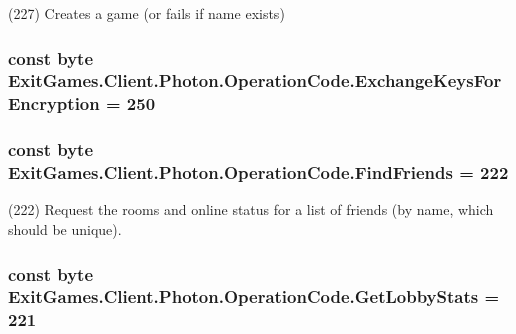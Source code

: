 (227) Creates a game (or fails if name exists)

\subsubsection[{\texorpdfstring{Exchange\+Keys\+For\+Encryption}{ExchangeKeysForEncryption}}]{\setlength{\rightskip}{0pt plus 5cm}const byte Exit\+Games.\+Client.\+Photon.\+Operation\+Code.\+Exchange\+Keys\+For\+Encryption = 250}\hypertarget{class_exit_games_1_1_client_1_1_photon_1_1_operation_code_afa955a532c6293b315db995fc1cadd4a}{}\label{class_exit_games_1_1_client_1_1_photon_1_1_operation_code_afa955a532c6293b315db995fc1cadd4a}
\subsubsection[{\texorpdfstring{Find\+Friends}{FindFriends}}]{\setlength{\rightskip}{0pt plus 5cm}const byte Exit\+Games.\+Client.\+Photon.\+Operation\+Code.\+Find\+Friends = 222}\hypertarget{class_exit_games_1_1_client_1_1_photon_1_1_operation_code_a798a8291fd87aa865d470cd1f09f05b5}{}\label{class_exit_games_1_1_client_1_1_photon_1_1_operation_code_a798a8291fd87aa865d470cd1f09f05b5}


(222) Request the rooms and online status for a list of friends (by name, which should be unique).

\subsubsection[{\texorpdfstring{Get\+Lobby\+Stats}{GetLobbyStats}}]{\setlength{\rightskip}{0pt plus 5cm}const byte Exit\+Games.\+Client.\+Photon.\+Operation\+Code.\+Get\+Lobby\+Stats = 221}\hypertarget{class_exit_games_1_1_client_1_1_photon_1_1_operation_code_ab495c557979c0d0bae83444712ce8acc}{}\label{class_exit_games_1_1_client_1_1_photon_1_1_operation_code_ab495c557979c0d0bae83444712ce8acc}


